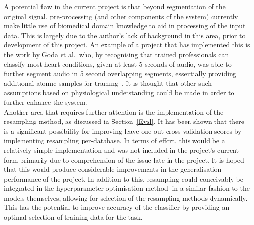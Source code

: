 \documentclass[titlepage, 12pt]{scrartcl} \usepackage{enumitem}
\begin{document}
A potential flaw in the current project is that beyond segmentation of the
original signal, pre-processing (and other components of the system) currently
make little use of biomedical domain knowledge to aid in processing of the
input data.  This is largely due to the author's lack of background in this
area, prior to development of this project. An example of a project that has
implemented this is the work by Goda et al.\ who, by recognising that trained professionals
can classify most heart conditions, given at least 5 seconds of audio, was able to
further segment audio in 5 second overlapping segments, essentially providing
additional atomic samples for training~\parencite{Goda2016}. It is thought that
other such assumptions based on physiological understanding could be made in
order to further enhance the system.\\

Another area that requires further attention is the implementation of the resampling
method, as discussed in Section~\ref{Eval}. It has been shown that there is a
significant possibility for improving leave-one-out cross-validation scores by
implementing resampling per-database. In terms of effort, this would be a
relatively simple implementation and was not included in the project's current
form primarily due to comprehension of the issue late in the project. It is
hoped that this would produce considerable improvements in the generalisation
performance of the project. In addition to this, resampling could conceivably
be integrated in the hyperparameter optimisation method, in a similar fashion
to the models themselves, allowing for selection of the resampling methods
dynamically. This has the potential to improve accuracy of the classifier by
providing an optimal selection of training data for the task.\\
\end{document}
